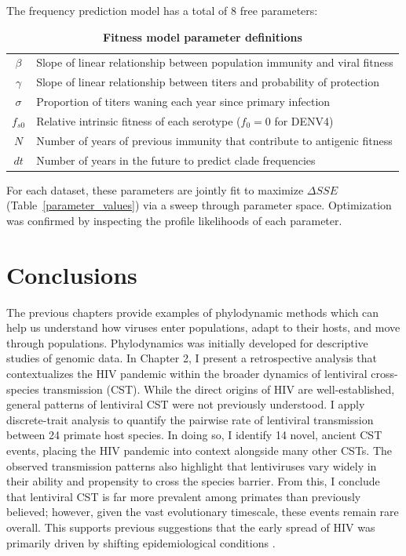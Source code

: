 The frequency prediction model has a total of 8 free parameters:
\begin{centering}
\begin{table}[ht!]
    \caption[Fitness model parameter definitions]{\textbf{Fitness model parameter definitions}}
    \begin{tabular}{c|l}
      $\beta$ & Slope of linear relationship between population immunity and viral fitness\\
      $\gamma$ & Slope of linear relationship between titers and probability of protection\\
      $\sigma$ & Proportion of titers waning each year since primary infection\\
      $f_{s0}$ & Relative intrinsic fitness of each serotype ($f_0 = 0$ for DENV4)\\
      $N$ & Number of years of previous immunity that contribute to antigenic fitness\\
      $dt$ & Number of years in the future to predict clade frequencies\\
    \end{tabular}
    \label{parameter_definition}
\end{table}
\end{centering}

For each dataset, these parameters are jointly fit to maximize $\Delta SSE$ (Table~\ref{parameter_values}) via a sweep through parameter space.
Optimization was confirmed by inspecting the profile likelihoods of each parameter.



\chapter{Conclusions}

The previous chapters provide examples of phylodynamic methods which can help us understand how viruses enter populations, adapt to their hosts, and move through populations.
Phylodynamics was initially developed for descriptive studies of genomic data.
In Chapter 2, I present a retrospective analysis that contextualizes the HIV pandemic within the broader dynamics of lentiviral cross-species transmission (CST).
While the direct origins of HIV are well-established, general patterns of lentiviral CST were not previously understood.
I apply discrete-trait analysis to quantify the pairwise rate of lentiviral transmission between 24 primate host species.
In doing so, I identify 14 novel, ancient CST events, placing the HIV pandemic into context alongside many other CSTs.
The observed transmission patterns also highlight that lentiviruses vary widely in their ability and propensity to cross the species barrier.
From this, I conclude that lentiviral CST is far more prevalent among primates than previously believed; however, given the vast evolutionary timescale, these events remain rare overall.
This supports previous suggestions that the early spread of HIV was primarily driven by shifting epidemiological conditions \citep{faria2014early}.

